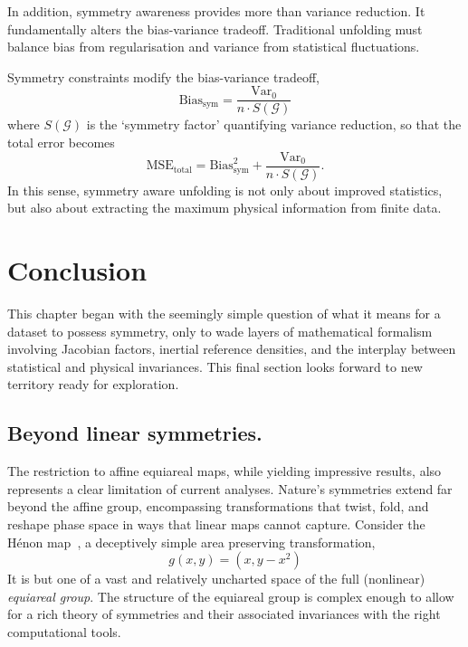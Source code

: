         In addition, symmetry awareness provides more than variance reduction.
        It fundamentally alters the bias-variance tradeoff.
        Traditional unfolding must balance bias from regularisation and variance from statistical fluctuations.
        
        Symmetry constraints modify the bias-variance tradeoff,
        \[
            \text{Bias}_{\text{sym}} = \frac{\text{Var}_0}{n \cdot S(\mathcal{G})}
        \]
        where \(S(\mathcal{G})\) is the `symmetry factor' quantifying variance reduction, so that the total error becomes
        \[
            \text{MSE}_{\text{total}} = \text{Bias}_{\text{sym}}^2 + \frac{\text{Var}_0}{n \cdot S(\mathcal{G})}.
        \]
        In this sense, symmetry aware unfolding is not only about improved statistics, but also about extracting the maximum physical information from finite data.

\section{Conclusion}
\label{sec:symmetrygan-conclusion}
    This chapter began with the seemingly simple question of what it means for a dataset to possess symmetry, only to wade layers of mathematical formalism involving Jacobian factors, inertial reference densities, and the interplay between statistical and physical invariances.
    This final section looks forward to new territory ready for exploration.

    \subsection{Beyond linear symmetries.}
        The restriction to affine equiareal maps, while yielding impressive results, also represents a clear limitation of current analyses.
        Nature's symmetries extend far beyond the affine group, encompassing transformations that twist, fold, and reshape phase space in ways that linear maps cannot capture.
        Consider the H\'enon map~\cite{ibanez_simple_1976}, a deceptively simple area preserving transformation,
        \[
            g(x,y) = (x, y - x^2)
        \]
        It is but one of a vast and relatively uncharted space of the full (nonlinear) \emph{equiareal group}.
        The structure of the equiareal group is complex enough to allow for a rich theory of symmetries and their associated invariances with the right computational tools.
        
